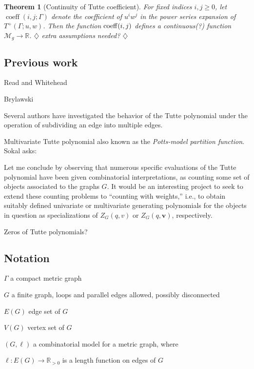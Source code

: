 \documentclass{amsart}
\newtheorem{thm}{Theorem}
\theoremstyle{definition}
\newcommand{\RR}{\mathbb{R}}
\DeclareMathOperator{\coeff}{coeff}
\newcommand{\harry}[1]{{\color{red} \sf $\diamondsuit$  {#1} $\diamondsuit$ }}
\newcommand{\note}[1]{\harry{#1}}
\begin{document}
\begin{thm}[Continuity of Tutte coefficient]
For fixed indices $i,j\geq 0$,
let $\coeff(i,j; \Gamma)$
denote the coefficient of $u^i w^j$ in the power series expansion of $T^+(\Gamma; u,w)$.
Then the function ${\rm coeff}(i,j)$
defines a continuous(?) 
function $\mathcal M_g \to \RR$.
\note{extra assumptions needed?}
\end{thm}

\subsection{Previous work} 

Read and Whitehead \cite{RW2}

Brylawski \cite{Bry}

Several authors have investigated the behavior of the Tutte polynomial under the operation of subdividing an edge into multiple edges.

\cite{Tra1,Tra2,Tra3}

\cite{RW1,RW2}

Multivariate Tutte polynomial \cite{Sok-potts}
also known as the {\em Potts-model partition function}.
Sokal \cite{Sok-potts} asks:
\begin{displayquote}
Let me conclude by observing that numerous specific evaluations of the Tutte polynomial have been given combinatorial interpretations, 
as counting some set of objects associated to the graphs $G$. 
It would be an interesting project to seek to extend these counting problems to ``counting with weights,''
i.e., to obtain suitably defined univariate or multivariate generating polynomials for the objects in question as specializations of 
$Z_G(q,v)$ or $Z_G(q,\mathbf{v})$, respectively.
\end{displayquote}
Zeros of Tutte polynomials?

\subsection{Notation}

$\Gamma$ a compact metric graph

$G$ a finite graph, 
loops and parallel edges allowed,
possibly disconnected

$E(G)$ edge set of $G$

$V(G)$ vertex set of $G$

$(G,\ell)$ a combinatorial model for a metric graph,
where 

$\ell : E(G) \to \RR_{>0}$
is a length function on edges of $G$
\end{document}

